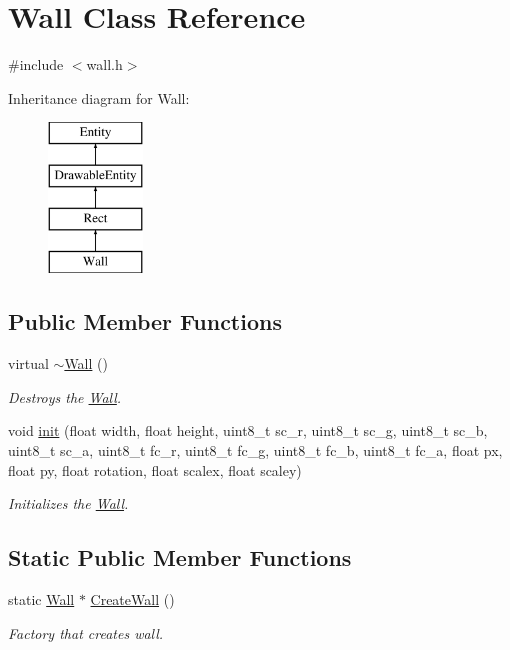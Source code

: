 \hypertarget{class_wall}{}\section{Wall Class Reference}
\label{class_wall}


{\ttfamily \#include $<$wall.\+h$>$}

Inheritance diagram for Wall\+:\begin{figure}[H]
\begin{center}
\leavevmode
\includegraphics[height=4.000000cm]{class_wall}
\end{center}
\end{figure}
\subsection*{Public Member Functions}
\begin{DoxyCompactItemize}
\item 
virtual \hyperlink{class_wall_a794dcff9a7ee62de3e8db816424e0050}{$\sim$\+Wall} ()
\begin{DoxyCompactList}\small\item\em Destroys the \hyperlink{class_wall}{Wall}. \end{DoxyCompactList}\item 
void \hyperlink{class_wall_a49c23105741c9f9d546a131a08573e9f}{init} (float width, float height, uint8\+\_\+t sc\+\_\+r, uint8\+\_\+t sc\+\_\+g, uint8\+\_\+t sc\+\_\+b, uint8\+\_\+t sc\+\_\+a, uint8\+\_\+t fc\+\_\+r, uint8\+\_\+t fc\+\_\+g, uint8\+\_\+t fc\+\_\+b, uint8\+\_\+t fc\+\_\+a, float px, float py, float rotation, float scalex, float scaley)
\begin{DoxyCompactList}\small\item\em Initializes the \hyperlink{class_wall}{Wall}. \end{DoxyCompactList}\end{DoxyCompactItemize}
\subsection*{Static Public Member Functions}
\begin{DoxyCompactItemize}
\item 
static \hyperlink{class_wall}{Wall} $\ast$ \hyperlink{class_wall_a7f2063fe4fd2f49ebc64f5a6a873bfa3}{Create\+Wall} ()
\begin{DoxyCompactList}\small\item\em Factory that creates wall. \end{DoxyCompactList}\end{DoxyCompactItemize}

